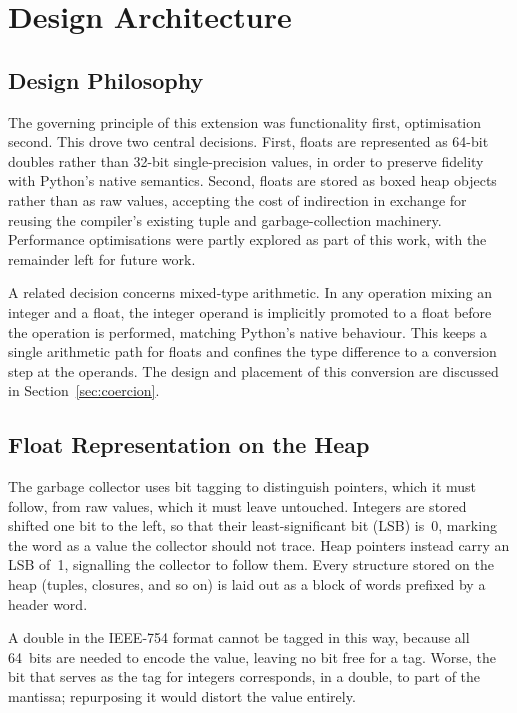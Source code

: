 \chapter{Design Architecture}\label{chap:design_architecture}

\section{Design Philosophy}

The governing principle of this extension was functionality first, optimisation second. This drove two central decisions. First, floats are represented as 64-bit doubles rather than 32-bit single-precision values, in order to preserve fidelity with Python's native semantics. Second, floats are stored as boxed heap objects rather than as raw values, accepting the cost of indirection in exchange for reusing the compiler's existing tuple and garbage-collection machinery. Performance optimisations were partly explored as part of this work, with the remainder left for future work.

A related decision concerns mixed-type arithmetic. In any operation mixing an integer and a float, the integer operand is implicitly promoted to a float before the operation is performed, matching Python's native behaviour. This keeps a single arithmetic path for floats and confines the type difference to a conversion step at the operands. The design and placement of this conversion are discussed in Section~\ref{sec:coercion}.

\section{Float Representation on the Heap}

The garbage collector uses bit tagging to distinguish pointers, which it must follow, from raw values, which it must leave untouched. Integers are stored shifted one bit to the left, so that their least-significant bit (LSB) is~0, marking the word as a value the collector should not trace. Heap pointers instead carry an LSB of~1, signalling the collector to follow them. Every structure stored on the heap (tuples, closures, and so on) is laid out as a block of words prefixed by a header word.

A double in the IEEE-754 format cannot be tagged in this way, because all 64~bits are needed to encode the value, leaving no bit free for a tag. Worse, the bit that serves as the tag for integers corresponds, in a double, to part of the mantissa; repurposing it would distort the value entirely.


